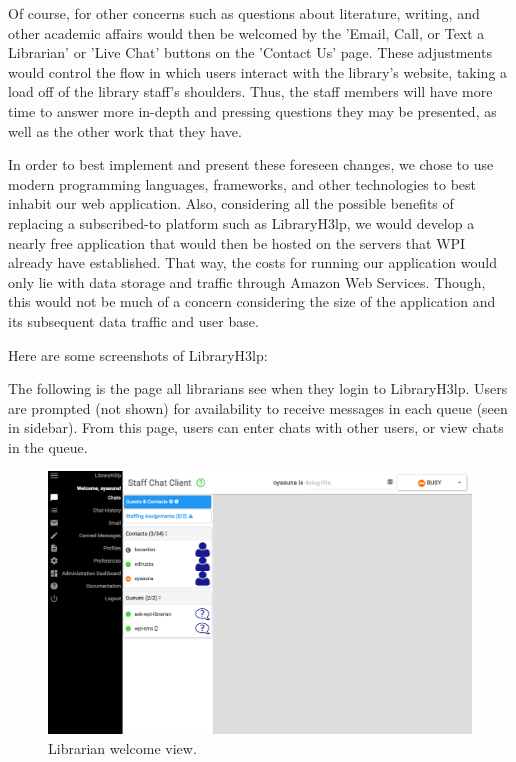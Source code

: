 Of course, for other concerns such as questions about literature, writing, and other academic affairs would then be welcomed by the 'Email, Call, or Text a Librarian' or 'Live Chat' buttons on the 'Contact Us' page. These adjustments would control the flow in which users interact with the library's website, taking a load off of the library staff's shoulders. Thus, the staff members will have more time to answer more in-depth and pressing questions they may be presented, as well as the other work that they have.

In order to best implement and present these foreseen changes, we chose to use modern programming languages, frameworks, and other technologies to best inhabit our web application. Also, considering all the possible benefits of replacing a subscribed-to platform such as LibraryH3lp, we would develop a nearly free application that would then be hosted on the servers that WPI already have established. That way, the costs for running our application would only lie with data storage and traffic through Amazon Web Services. Though, this would not be much of a concern considering the size of the application and its subsequent data traffic and user base.



Here are some screenshots of LibraryH3lp:

The following is the page all librarians see when they login to LibraryH3lp.
Users are prompted (not shown) for availability to receive messages in each queue (seen in sidebar).
From this page, users can enter chats with other users, or view chats in the queue.

\begin{figure}[H]
    \centering
    \includegraphics[width=\textwidth]{assets/img/libraryh3lp/libraryh3lp_welcome.png}
    \caption{Librarian welcome view.}
\end{figure}

